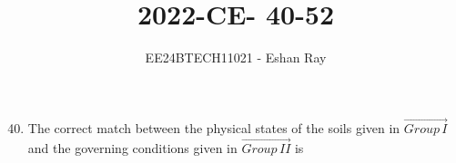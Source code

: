 \documentclass[journal]{IEEEtran}
\begin{document}

\vspace{3cm}

\title{2022-CE- 40-52}
\author{EE24BTECH11021 - Eshan Ray}

{\let\newpage\relax\maketitle}

\renewcommand{\thefigure}{\theenumi}
\renewcommand{\thetable}{\theenumi}
\setlength{\intextsep}{10pt} %

\begin{enumerate}
\setcounter{enumi}{39}
    \item The correct match between the physical states of the soils given in $\vec{Group\, I}$ and
the governing conditions given in $\vec{Group\, II}$ is 
\begin{table}[H]    
  \centering
  
 \end{table}


\end{enumerate}
\end{document}

